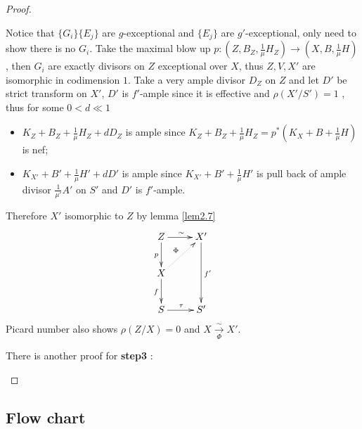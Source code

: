 \documentclass{article}
\begin{document}
\begin{proof}
\begin{enumerate}
    Notice that $ \{G_i\} \{E_j\} $ are $ g $-exceptional and $ \{E_j\} $ are $ g' $-exceptional, only need to show there is no $ G_i $. Take the maximal blow up $ p:(Z,B_Z,\frac{1}{\mu} H_Z)\to (X,B,\frac{1}{\mu} H) $, then $ G_i $ are exactly divisors on $ Z $ exceptional over $ X $, thus $ Z,V,X' $ are isomorphic in codimension $ 1 $. Take a very ample divisor $ D_Z $ on $ Z $ and let $ D'  $ be strict transform on $ X' $, $ D' $ is $ f' $-ample since it is effective and $ \rho(X'/S')=1 $ , thus for some $ 0<d\ll1 $ 
    \begin{itemize}
      \item $ K_Z+B_Z+\frac{1}{\mu }H_Z+dD_Z $ is ample since $ K_Z+B_Z+\frac{1}{\mu }H_Z=p^*(K_X+B+\frac{1}{\mu }H) $ is nef;
      \item $ K_{X'}+B'+\frac{1}{\mu }H'+dD' $ is ample since $ K_{X'}+B'+\frac{1}{\mu }H' $ is pull back of ample divisor $ \frac{1}{\mu'}A' $ on $ S' $ and $ D' $ is $ f' $-ample.
    \end{itemize}
    Therefore $ X' $ isomorphic to $ Z $ by lemma \ref{lem2.7}
    $$ \xymatrix{
      Z\ar[r]^\sim\ar[d]_p&X'\ar[dd]^{f'}\\
      X\ar[d]_f\ar@{.>}[ur]^\Phi&\\
    S\ar[r]^\tau&S' } $$
    Picard number also shows $ \rho(Z/X)=0 $ and $ X\xrightarrow[\Phi]{\sim}X' $.
    
    There is another proof for \textbf{step3} :
  \end{enumerate}
\end{proof}


\subsection{Flow chart}
\end{document}

